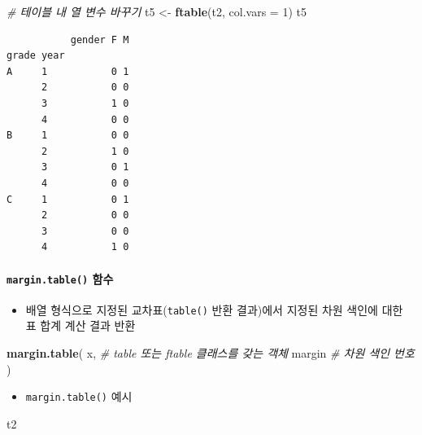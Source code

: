 \documentclass[
  11pt,
]{krantz}
\newenvironment{Shaded}{\begin{snugshade}}{\end{snugshade}}
\newcommand{\CommentTok}[1]{\textcolor[rgb]{0.37,0.37,0.37}{\textit{#1}}}
\newcommand{\DataTypeTok}[1]{\textcolor[rgb]{0.27,0.27,0.27}{#1}}
\newcommand{\DecValTok}[1]{\textcolor[rgb]{0.06,0.06,0.06}{#1}}
\newcommand{\KeywordTok}[1]{\textcolor[rgb]{0.27,0.27,0.27}{\textbf{#1}}}
\newcommand{\NormalTok}[1]{#1}
\newcommand{\StringTok}[1]{\textcolor[rgb]{0.5,0.5,0.5}{#1}}
\providecommand{\tightlist}{%
  \setlength{\itemsep}{0pt}\setlength{\parskip}{0pt}}
\begin{document}
\begin{Shaded}
\begin{Highlighting}[]
\CommentTok{# 테이블 내 열 변수 바꾸기}
\NormalTok{t5 <-}\StringTok{ }\KeywordTok{ftable}\NormalTok{(t2, }\DataTypeTok{col.vars =} \DecValTok{1}\NormalTok{)}
\NormalTok{t5}
\end{Highlighting}
\end{Shaded}

\begin{verbatim}
           gender F M
grade year           
A     1           0 1
      2           0 0
      3           1 0
      4           0 0
B     1           0 0
      2           1 0
      3           0 1
      4           0 0
C     1           0 1
      2           0 0
      3           0 0
      4           1 0
\end{verbatim}

\normalsize

\hypertarget{table-fun4}{%
\paragraph{\texorpdfstring{\texttt{margin.table()} 함수}{margin.table() 함수}}\label{table-fun4}}

\begin{itemize}
\tightlist
\item
  배열 형식으로 지정된 교차표(\texttt{table()} 반환 결과)에서 지정된 차원 색인에 대한 표 합계 계산 결과 반환
\end{itemize}

\footnotesize

\begin{Shaded}
\begin{Highlighting}[]
\KeywordTok{margin.table}\NormalTok{(}
\NormalTok{  x,  }\CommentTok{# table 또는 ftable 클래스를 갖는 객체}
\NormalTok{  margin }\CommentTok{# 차원 색인 번호}
\NormalTok{)}
\end{Highlighting}
\end{Shaded}

\normalsize

\begin{itemize}
\tightlist
\item
  \texttt{margin.table()} 예시
\end{itemize}

\footnotesize

\begin{Shaded}
\begin{Highlighting}[]
\NormalTok{t2}
\end{Highlighting}
\end{Shaded}
\end{document}
